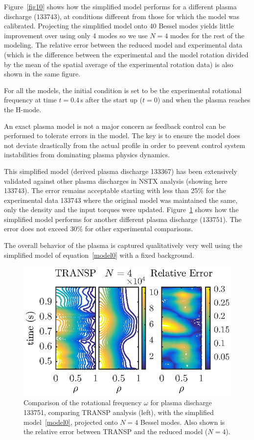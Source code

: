 \documentclass[12pt,lot, lof]{puthesis}
\begin{document}
Figure~\ref{fig10} shows how the simplified model performs for a different plasma discharge ($133743$), at conditions different from those for which the model was calibrated. 
Projecting the simplified model onto 40 Bessel modes yields little improvement over using only 4 modes so we use $N=4$ modes for the rest of the modeling.
The relative error between the reduced model and experimental data (which is the difference between the experimental and the model rotation divided by the mean of the spatial average of the experimental rotation data) is also shown in  the same figure.

For all the models, the initial condition is set to be the experimental rotational frequency at  time $t=0.4$\,s after the start up ($t=0$) and when the plasma reaches the H-mode.

An exact plasma model is not a major concern as feedback control can be performed to tolerate errors in the model. The key is to ensure the model does not deviate drastically from the actual profile in order to prevent control system instabilities from dominating plasma physics dynamics.

This simplified model (derived plasma discharge 133367) has been extensively validated against other plasma discharges in NSTX analysis (showing here 133743). The error remains acceptable starting with less than 25\% for the  experimental data 133743 where the original model was maintained the same, only the density and the input torques were updated. Figure~\ref{fig99} shows how the simplified model performs for another different plasma discharge ($133751$). The error does not exceed 30\% for other experimental comparisons. 

The overall behavior of the plasma is captured qualitatively very well using the simplified model of equation~\eqref{model0} with a fixed background. 



\begin{figure}
\includegraphics[width=0.9 \linewidth]{fig10}
\caption{Comparison of the rotational frequency $\omega$ for plasma discharge 133751, comparing TRANSP analysis (left), with the simplified model~\eqref{model0}, projected onto $N=4$ Bessel modes.  Also shown is the relative error between TRANSP and the reduced model ($N=4$).}
\label{fig99}
\end{figure}
\end{document}

